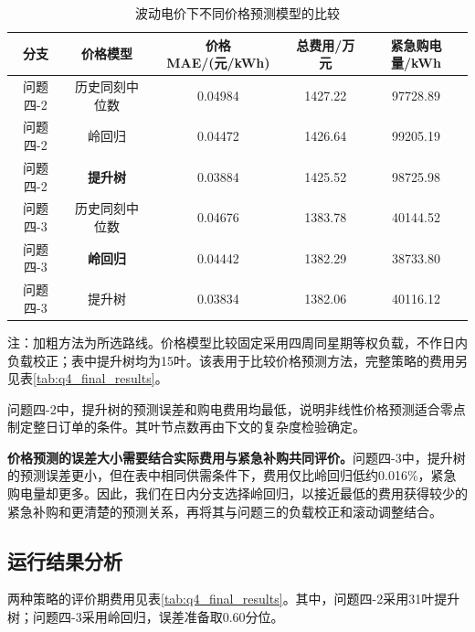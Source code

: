 \begin{table}[!htbp]
    \centering
    \caption{波动电价下不同价格预测模型的比较}
    \label{tab:q4_price_comparison}
    \begin{tabular}{ccccc}
        \hline
        分支 & 价格模型 & 价格MAE/(元/kWh) & 总费用/万元 & 紧急购电量/kWh \\
        \hline
        问题四-2 & 历史同刻中位数 & 0.04984 & 1427.22 & 97728.89 \\
        问题四-2 & 岭回归 & 0.04472 & 1426.64 & 99205.19 \\
        问题四-2 & \textbf{提升树} & 0.03884 & 1425.52 & 98725.98 \\
        \hline
        问题四-3 & 历史同刻中位数 & 0.04676 & 1383.78 & 40144.52 \\
        问题四-3 & \textbf{岭回归} & 0.04442 & 1382.29 & 38733.80 \\
        问题四-3 & 提升树 & 0.03834 & 1382.06 & 40116.12 \\
        \hline
    \end{tabular}
    \par\smallskip
    \begin{minipage}{0.96\textwidth}
    \small 注：加粗方法为所选路线。价格模型比较固定采用四周同星期等权负载，不作日内负载校正；表中提升树均为15叶。该表用于比较价格预测方法，完整策略的费用另见表\ref{tab:q4_final_results}。
    \end{minipage}
\end{table}

问题四-2中，提升树的预测误差和购电费用均最低，说明非线性价格预测适合零点制定整日订单的条件。其叶节点数再由下文的复杂度检验确定。

\textbf{价格预测的误差大小需要结合实际费用与紧急补购共同评价。}问题四-3中，提升树的预测误差更小，但在表中相同供需条件下，费用仅比岭回归低约0.016\%，紧急购电量却更多。因此，我们在日内分支选择岭回归，以接近最低的费用获得较少的紧急补购和更清楚的预测关系，再将其与问题三的负载校正和滚动调整结合。

\subsection{运行结果分析}

两种策略的评价期费用见表\ref{tab:q4_final_results}。其中，问题四-2采用31叶提升树；问题四-3采用岭回归，误差准备取0.60分位。

